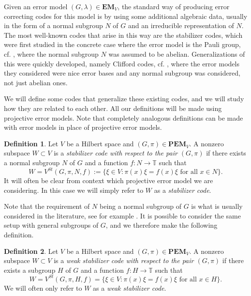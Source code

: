 \documentclass[11pt, oneside, reqno]{amsart}
\newcommand{\bbT}{\mathbb{T}}
\newcommand{\EM}{\mathbf{EM}}
\newcommand{\PEM}{\mathbf{PEM}}
\theoremstyle{definition}
\newtheorem{definition}{Definition}[section]
\theoremstyle{plain}
\theoremstyle{remark}
\begin{document}
Given an error model $(G,\lambda) \in \EM_V$, the standard way of producing error correcting codes for this model is by using some additional algebraic data, usually in the form of a normal subgroup $N$ of $G$ and an irreducible representation of $N$. The most well-known codes that arise in this way are the stabilizer codes, which were first studied in the concrete case where the error model is the Pauli group, cf. \cite{Gottesman97,Calderbank97}, where the normal subgroup $N$ was assumed to be abelian. Generalizations of this were quickly developed, namely Clifford codes, cf. \cite{KnillI96, KlappeneckerRöttelerI02, KlappeneckerRöttelerII02}, where the error models they considered were nice error bases and any normal subgroup was considered, not just abelian ones.

We will define some codes that generalize these existing codes, and we will study how they are related to each other. All our definitions will be made using projective error models. Note that completely analogous definitions can be made with error models in place of projective error models.

\begin{definition}\label{def:stabilizer code}
    Let $V$ be a Hilbert space and $(G,\pi) \in \PEM_V$. A nonzero subspace $W \subset V$ is a \emph{stabilizer code with respect to the pair $(G,\pi)$} if there exists a normal subgroup $N$ of $G$ and a function $f \colon N \to \bbT$ such that
    \begin{equation*}
        W = V^{St}(G,\pi,N,f) := \{ \xi \in V \colon \pi(x) \xi = f(x)\xi \text{ for all } x \in N \}.
    \end{equation*}
    It will often be clear from context which projective error model we are considering. In this case we will simply refer to $W$ as a \emph{stabilizer code}.
\end{definition}

Note that the requirement of $N$ being a normal subgroup of $G$ is what is usually considered in the literature, see for example \cite{KlappeneckerRöttelerII02}. It is possible to consider the same setup with general subgroups of $G$, and we therefore make the following definition.

\begin{definition}\label{def:weak stabilizer code}
    Let $V$ be a Hilbert space and $(G,\pi) \in \PEM_V$. A nonzero subspace $W \subset V$ is a \emph{weak stabilizer code with respect to the pair $(G,\pi)$} if there exists a subgroup $H$ of $G$ and a function $f \colon H \to \bbT$ such that
    \begin{equation*}
        W = V^{St}(G,\pi,H,f) = \{ \xi \in V \colon \pi(x) \xi = f(x)\xi \text{ for all } x \in H \}.
    \end{equation*}
    We will often only refer to $W$ as a \emph{weak stabilizer code}.
\end{definition}
\end{document}
